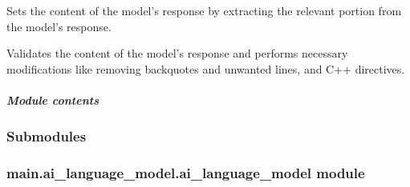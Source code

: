 \documentclass[letterpaper,10pt,english]{sphinxmanual}
\begin{document}
\begin{fulllineitems}
\begin{fulllineitems}
\label{\detokenize{main.ai_language_model.models:main.ai_language_model.models.gpt_3_5_turbo.GPT3_5TurboModel.set_response_content}}
\pysigstartsignatures
{}
\pysigstopsignatures
\sphinxAtStartPar
Sets the content of the model’s response by extracting the relevant portion
from the model’s response.

\end{fulllineitems}


\begin{fulllineitems}
\label{\detokenize{main.ai_language_model.models:main.ai_language_model.models.gpt_3_5_turbo.GPT3_5TurboModel.validate_response_content}}
\pysigstartsignatures
{}
\pysigstopsignatures
\sphinxAtStartPar
Validates the content of the model’s response and performs necessary modifications like removing backquotes and
unwanted lines, and C++ directives.

\end{fulllineitems}


\end{fulllineitems}



\subparagraph{Module contents}
\label{\detokenize{main.ai_language_model.models:module-main.ai_language_model.models}}\label{\detokenize{main.ai_language_model.models:module-contents}}

\subsubsection{Submodules}
\label{\detokenize{main.ai_language_model:submodules}}

\subsubsection{main.ai\_language\_model.ai\_language\_model module}
\label{\detokenize{main.ai_language_model:module-main.ai_language_model.ai_language_model}}\label{\detokenize{main.ai_language_model:main-ai-language-model-ai-language-model-module}}
\end{document}
